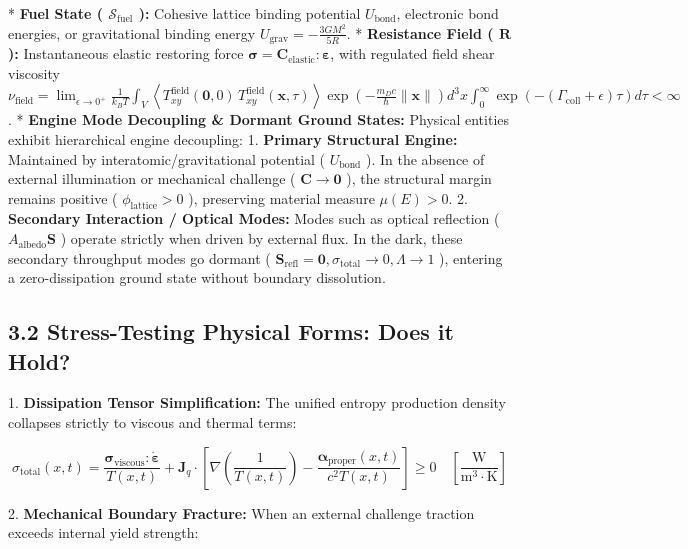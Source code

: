 \documentclass[11pt,a4paper]{article}
\theoremstyle{definition}
\theoremstyle{remark}
\begin{document}
* \textbf{Fuel State ( $\mathcal{S}_{\text{fuel}}$ ):} Cohesive lattice binding potential $U_{\text{bond}}$, electronic bond energies, or gravitational binding energy $U_{\text{grav}} = -\frac{3 G M^2}{5 R}$.
* \textbf{Resistance Field ( $\mathbf{R}$ ):} Instantaneous elastic restoring force $\boldsymbol{\sigma} = \mathbf{C}_{\text{elastic}} : \boldsymbol{\varepsilon}$, with regulated field shear viscosity $\nu_{\text{field}} = \lim_{\epsilon \to 0^+} \frac{1}{k_B T} \int_V \left\langle T_{xy}^{\text{field}}(\mathbf{0}, 0) \, T_{xy}^{\text{field}}(\mathbf{x}, \tau) \right\rangle \exp\left( -\frac{m_D c}{\hbar}\|\mathbf{x}\| \right) d^3x \int_0^\infty \exp\left( -\left(\Gamma_{\text{coll}} + \epsilon\right)\tau \right) d\tau < \infty$.
* \textbf{Engine Mode Decoupling \& Dormant Ground States:}
Physical entities exhibit hierarchical engine decoupling:
1. \textbf{Primary Structural Engine:} Maintained by interatomic/gravitational potential ( $U_{\text{bond}}$ ). In the absence of external illumination or mechanical challenge ( $\mathbf{C} \to \mathbf{0}$ ), the structural margin remains positive ( $\phi_{\text{lattice}} > 0$ ), preserving material measure $\mu(E) > 0$.
2. \textbf{Secondary Interaction / Optical Modes:} Modes such as optical reflection ( $A_{\text{albedo}} \mathbf{S}$ ) operate strictly when driven by external flux. In the dark, these secondary throughput modes go dormant ( $\mathbf{S}_{\text{refl}} = \mathbf{0}, \sigma_{\text{total}} \to 0, \Lambda \to 1$ ), entering a zero-dissipation ground state without boundary dissolution.

\subsection{3.2 Stress-Testing Physical Forms: Does it Hold?}

1. \textbf{Dissipation Tensor Simplification:}
The unified entropy production density collapses strictly to viscous and thermal terms:


\begin{equation}
\sigma_{\text{total}}(x, t) = \frac{\boldsymbol{\sigma}_{\text{viscous}} : \dot{\boldsymbol{\varepsilon}}}{T(x, t)} + \mathbf{J}_q \cdot [ \nabla\left(\frac{1}{T(x, t)}\right) - \frac{\boldsymbol{\alpha}_{\text{proper}}(x, t)}{c^2 T(x, t)} ] \ge 0 \quad [\frac{\mathrm{W}}{\mathrm{m^3 \cdot K}}]
\end{equation}


2. \textbf{Mechanical Boundary Fracture:}
When an external challenge traction exceeds internal yield strength:
\end{document}
